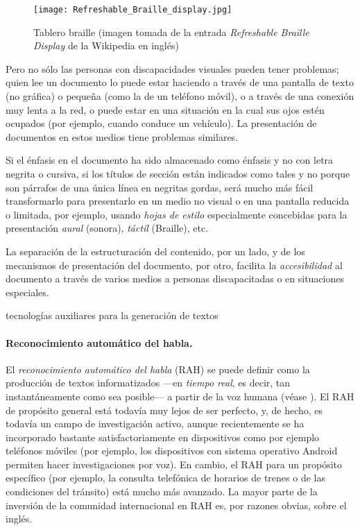 {\begin{figure} \centering

\texttt{[image: Refreshable\_Braille\_display.jpg]} \caption{Tablero braille (imagen tomada de la entrada \emph{Refreshable Braille Display} de la Wikipedia en inglés)} \end{figure} 

Pero no sólo las personas con discapacidades visuales pueden tener problemas; quien lee un documento lo puede estar haciendo a través de una pantalla de texto (no gráfica) o pequeña (como la de un teléfono móvil), o a través de una conexión muy lenta a la red, o puede estar en una situación en la cual sus ojos estén ocupados (por ejemplo, cuando conduce un vehículo). La presentación de documentos en estos medios tiene problemas similares. 

Si el énfasis en el documento ha sido almacenado como énfasis y no con letra negrita o cursiva, si los títulos de sección están indicados como tales y no porque son párrafos de una única línea en negritas gordas, será mucho más fácil transformarlo para presentarlo en un medio no visual o en una pantalla reducida o limitada, por ejemplo, usando \emph{hojas de estilo} especialmente concebidas para la presentación \emph{aural} (sonora), \emph{táctil} (Braille), etc. 

La separación de la estructuración del contenido, por un lado, y de los mecanismos de presentación del documento, por otro, facilita la \emph{accesibilidad} al documento a través de varios medios a personas discapacitadas o en situaciones especiales. 

\begin{persabermes}{tecnologías auxiliares para la generación de textos} \paragraph{Reconocimiento automático del habla.} El \emph{reconocimiento automático del habla} (RAH) se puede definir como la producción de textos informatizados ---en \emph{tiempo real}, es decir, tan instantáneamente como sea posible--- a partir de la voz humana (véase \citealt{samuelson-brown96b}). El RAH de propósito general está todavía muy lejos de ser perfecto, y, de hecho, es todavía un campo de investigación activo, aunque recientemente se ha incorporado bastante satisfactoriamente en dispositivos como por ejemplo teléfonos móviles (por ejemplo, los dispositivos con sistema operativo Android permiten hacer investigaciones por voz). En cambio, el RAH para un propósito específico (por ejemplo, la consulta telefónica de horarios de trenes o de las condiciones del tránsito) está mucho más avanzado. La mayor parte de la inversión de la comunidad internacional en RAH es, por razones obvias, sobre el inglés. 


\end{persabermes}}
